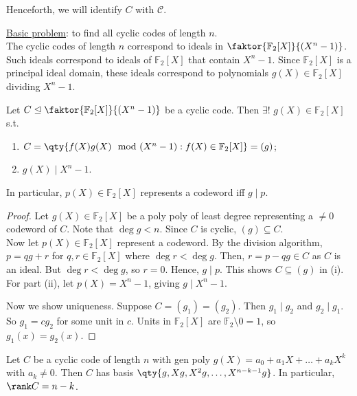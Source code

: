 Henceforth, we will identify $C$ with $\mathcal C$.

\underline{Basic problem}: to find all cyclic codes of length $n$. \\
The cyclic codes of length $n$ correspond to ideals in $\faktor{\mathbb F_2[X]}{(X^n - 1)}$.
Such ideals correspond to ideals of $\mathbb F_2[X]$ that contain $X^n - 1$.
Since $\mathbb F_2[X]$ is a principal ideal domain, these ideals correspond to polynomials $g(X) \in \mathbb F_2[X]$ dividing $X^n - 1$.

\begin{theorem}
    Let $C \trianglelefteq \faktor{\mathbb F_2[X]}{(X^n - 1)}$ be a cyclic code.
    Then $\exists!$  $g(X) \in \mathbb F_2[X]$ s.t.
    \begin{enumerate}
        \item $C = \qty{f(X) g(X) \mod (X^n -1) : f(X) \in \mathbb{F}_2[X]} = (g)$;
        \item $g(X) \mid X^n - 1$.
    \end{enumerate}
    In particular, $p(X) \in \mathbb F_2[X]$ represents a codeword iff $g \mid p$.
\end{theorem}

\begin{proof}
    Let $g(X) \in \mathbb F_2[X]$ be a poly poly of least degree representing a $\neq 0$ codeword of $C$.
    Note that $\deg g < n$.
    Since $C$ is cyclic, $(g) \subseteq C$. \\
    Now let $p(X) \in \mathbb F_2[X]$ represent a codeword.
    By the division algorithm, $p = qg + r$ for $q, r \in \mathbb F_2[X]$ where $\deg r < \deg g$.
    Then, $r = p - qg \in C$ as $C$ is an ideal.
    But $\deg r < \deg g$, so $r = 0$.
    Hence, $g \mid p$.
    This shows $C \subseteq (g)$ in (i). \\
    For part (ii), let $p(X) = X^n - 1$, giving $g \mid X^n - 1$.

    Now we show uniqueness.
    Suppose $C = (g_1) = (g_2)$.
    Then $g_1 \mid g_2$ and $g_2 \mid g_1$.
    So $g_1 = cg_2$ for some unit in $c$.
    Units in $\mathbb{F}_2[X]$ are $\mathbb{F}_2 \setminus \qty{0} = \qty{1}$, so $g_1(x) = g_2(x)$.
\end{proof}

\begin{lemma}
    Let $C$ be a cyclic code of length $n$ with gen poly $g(X) = a_0 + a_1 X + \dots + a_k X^k$ with $a_k \neq 0$.
    Then $C$ has basis $\qty{g, Xg, X^2g, \dots, X^{n-k-1}g}$.
    In particular, $\rank C = n - k$.
\end{lemma}

